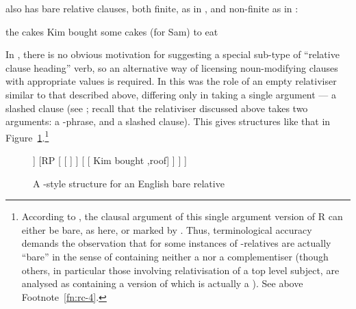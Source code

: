 \documentclass[output=paper
                ,modfonts
                ,nonflat
	        ,collection
	        ,collectionchapter
	        ,collectiontoclongg
 	        ,biblatex
                ,babelshorthands
                ,newtxmath
                ,draftmode
                ,colorlinks, citecolor=brown
]{./langsci/langscibook}
\begin{document}
 also has bare relative clauses, both finite, as in , and non-finite
as in :
\begin{exe}\ex\begin{xlist}\label{x:rc-88}
  \ex\label{x:rc-89} the cakes Kim bought \trace
  \ex\label{x:rc-90} some cakes (for Sam) to eat \trace
\end{xlist}\end{exe}
In , there is no obvious motivation for suggesting a special sub-type of ``relative
clause heading'' verb, so an alternative way of licensing noun-modifying clauses with
appropriate  values is required. In \cite{Pollard:Sag:94} this was the role
of an empty relativiser similar to that described above, differing only in taking a single
argument --- a slashed clause (see \citealt[222]{Pollard:Sag:94}; recall that the
relativiser discussed above takes two arguments: a -phrase, and a slashed
clause). This gives structures like that in Figure~\ref{fig:rc-7}.\footnote{According to
  \cite[222]{Pollard:Sag:94}, the clausal argument of this single argument version of R
  can either be bare, as here, or marked by . Thus, terminological accuracy
  demands the observation that for \citeauthor{Pollard:Sag:94} some instances of
  -relatives are actually ``bare'' in the sense of containing neither a  nor a complementiser (though others, in particular those involving
  relativisation of a top level subject, are analysed as containing a version of
   which is actually a ). See above Footnote~\ref{fn:rc-4}.}
\begin{figure}
    \begin{forest}  %
   [{\ibar{N}\subtag{1}} , baseline
      [{\idx{7}\ibar{N}\subtag{1}}  [ {cakes} ]  
      ]
      [{RP} 
            [{}     [ {\trace} ] ]
            [{}  [ {Kim bought} ,roof] ]
      ]
   ]
   \end{forest}
   \caption{A \cite{Pollard:Sag:94}-style structure for an English bare relative}
   \label{fig:rc-7}
\end{figure}
\end{document}
